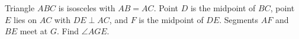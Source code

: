 Triangle $ABC$ is isosceles with $AB=AC$. Point $D$ is the midpoint of $BC$, point $E$ lies on $AC$ with $DE\perp AC$, and $F$ is the midpoint of $DE$. Segments $AF$ and $BE$ meet at $G$. Find $\angle AGE$.
